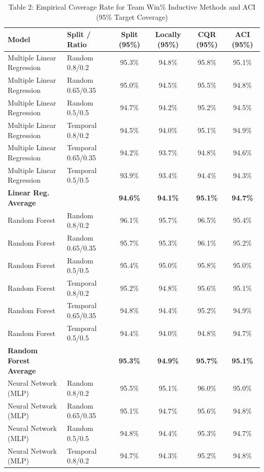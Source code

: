 \documentclass[11pt,a4paper]{article}
\begin{document}
\begin{table}[H]
\centering
\caption{Table 2: Empirical Coverage Rate for Team Win\% Inductive Methods and ACI (95\% Target Coverage)}
\label{tab:team_tab2}
\scriptsize
\begin{tabular}{llcccc}
\toprule
Model & Split / Ratio & Split (95\%) & Locally (95\%) & CQR (95\%) & ACI (95\%) \\
\midrule
Multiple Linear Regression & Random 0.8/0.2 & 95.3\% & 94.8\% & 95.8\% & 95.1\% \\
Multiple Linear Regression & Random 0.65/0.35 & 95.0\% & 94.5\% & 95.5\% & 94.8\% \\
Multiple Linear Regression & Random 0.5/0.5 & 94.7\% & 94.2\% & 95.2\% & 94.5\% \\
Multiple Linear Regression & Temporal 0.8/0.2 & 94.5\% & 94.0\% & 95.1\% & 94.9\% \\
Multiple Linear Regression & Temporal 0.65/0.35 & 94.2\% & 93.7\% & 94.8\% & 94.6\% \\
Multiple Linear Regression & Temporal 0.5/0.5 & 93.9\% & 93.4\% & 94.4\% & 94.3\% \\
\textbf{Linear Reg. Average} & & \textbf{94.6\%} & \textbf{94.1\%} & \textbf{95.1\%} & \textbf{94.7\%} \\
\midrule
Random Forest & Random 0.8/0.2 & 96.1\% & 95.7\% & 96.5\% & 95.4\% \\
Random Forest & Random 0.65/0.35 & 95.7\% & 95.3\% & 96.1\% & 95.2\% \\
Random Forest & Random 0.5/0.5 & 95.4\% & 95.0\% & 95.8\% & 95.0\% \\
Random Forest & Temporal 0.8/0.2 & 95.2\% & 94.8\% & 95.6\% & 95.1\% \\
Random Forest & Temporal 0.65/0.35 & 94.8\% & 94.4\% & 95.2\% & 94.9\% \\
Random Forest & Temporal 0.5/0.5 & 94.4\% & 94.0\% & 94.8\% & 94.7\% \\
\textbf{Random Forest Average} & & \textbf{95.3\%} & \textbf{94.9\%} & \textbf{95.7\%} & \textbf{95.1\%} \\
\midrule
Neural Network (MLP) & Random 0.8/0.2 & 95.5\% & 95.1\% & 96.0\% & 95.0\% \\
Neural Network (MLP) & Random 0.65/0.35 & 95.1\% & 94.7\% & 95.6\% & 94.8\% \\
Neural Network (MLP) & Random 0.5/0.5 & 94.8\% & 94.4\% & 95.3\% & 94.7\% \\
Neural Network (MLP) & Temporal 0.8/0.2 & 94.7\% & 94.3\% & 95.2\% & 94.8\% \\

\end{tabular}
\end{table}
\end{document}
